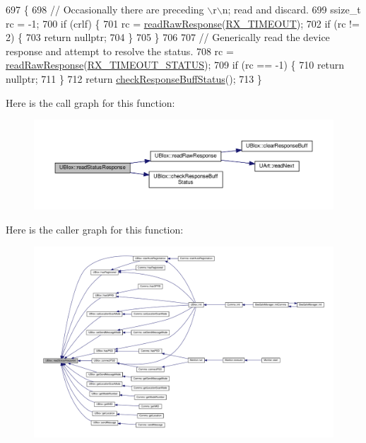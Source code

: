 \begin{DoxyCode}
697 \{
698     \textcolor{comment}{// Occasionally there are preceding \(\backslash\)r\(\backslash\)n; read and discard.}
699     ssize\_t rc = -1;
700     \textcolor{keywordflow}{if} (crlf) \{
701         rc = \hyperlink{class_u_blox_ab4a7ab4b8922d91e23f273ae160c1bed}{readRawResponse}(\hyperlink{_u_blox_8cpp_ab6426fc74901f4fbec94862ebb672b81}{RX\_TIMEOUT});
702         \textcolor{keywordflow}{if} (rc != 2) \{
703             \textcolor{keywordflow}{return} \textcolor{keyword}{nullptr};
704         \}
705     \}
706 
707     \textcolor{comment}{// Generically read the device response and attempt to resolve the status.}
708     rc = \hyperlink{class_u_blox_ab4a7ab4b8922d91e23f273ae160c1bed}{readRawResponse}(\hyperlink{_u_blox_8cpp_afed44347eb1fde151258e73004078c98}{RX\_TIMEOUT\_STATUS});
709     \textcolor{keywordflow}{if} (rc == -1) \{
710         \textcolor{keywordflow}{return} \textcolor{keyword}{nullptr};
711     \}
712     \textcolor{keywordflow}{return} \hyperlink{class_u_blox_aab6ad68e4c7522278f19ceab1dc2a58d}{checkResponseBuffStatus}();
713 \}
\end{DoxyCode}
Here is the call graph for this function\+:
\nopagebreak
\begin{figure}[H]
\begin{center}
\leavevmode
\includegraphics[width=350pt]{da/df6/class_u_blox_a4eaca5b1b1c4b5b6f6164b220dd43e0b_cgraph}
\end{center}
\end{figure}
Here is the caller graph for this function\+:
\nopagebreak
\begin{figure}[H]
\begin{center}
\leavevmode
\includegraphics[width=350pt]{da/df6/class_u_blox_a4eaca5b1b1c4b5b6f6164b220dd43e0b_icgraph}
\end{center}
\end{figure}
\mbox{\label{class_u_blox_a23c4bd15586b776045beaaa840c637f4}} 
